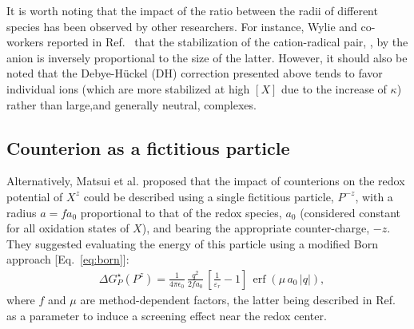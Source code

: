\documentclass[review,preprint]{elsarticle}
\DeclareMathOperator{\erf}{erf}
\begin{document}
It is worth noting that the impact of the ratio between the radii of different species has been observed by other researchers. For instance, Wylie and co-workers reported in Ref.~ that the stabilization of the cation-radical pair, , by the anion is inversely proportional to the size of the latter. However, it should also be noted that the Debye-Hückel (DH) correction presented above tends to favor individual ions (which are more stabilized at high $[X]$ due to the increase of $\kappa$) rather than large,and generally neutral, complexes.


\subsection{Counterion as a fictitious particle}

Alternatively, Matsui et al. \cite{matsuiDensityFunctionalTheory2013} proposed that the impact of counterions on the redox potential of $X^z$ could be described using a single fictitious particle, $P^{-z}$, with a radius $a=fa_0$ proportional to that of the redox species, $a_0$ (considered constant for all oxidation states of $X$), and bearing the appropriate counter-charge, $-z$. They suggested evaluating the energy of this particle using a modified Born approach [Eq.~\eqref{eq:born}]:\begin{align}
	&\Delta G^\star_{P}(P^z) = \frac{1}{4\pi\epsilon_0}\, \frac{q^2}{2fa_0}\,\left[\frac{1}{\varepsilon_r}-1\right]\,\erf(\mu\,a_0\,|q|),
\end{align}
where $f$ and $\mu$ are method-dependent factors, the latter being described in Ref.~\cite{matsuiDensityFunctionalTheory2013} as a parameter to induce a screening effect near the redox center.
\end{document}
